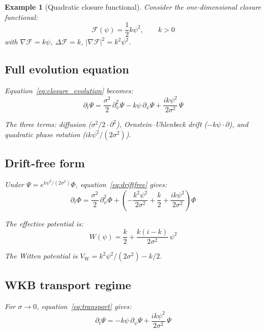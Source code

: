 \documentclass[12pt]{article}
\newtheorem{example}[theorem]{Example}
\newcommand{\Fcal}{\mathcal{F}}
\begin{document}
\begin{example}[Quadratic closure functional]\label{ex:quadratic}
Consider the one-dimensional closure functional:
\begin{equation}
    \Fcal(\psi) = \frac{1}{2}k\psi^2, \qquad k > 0
\end{equation}
with $\nabla\Fcal = k\psi$, $\Delta\Fcal = k$, $|\nabla\Fcal|^2 = k^2\psi^2$.

\subsection*{Full evolution equation}

Equation~\eqref{eq:closure_evolution} becomes:
\begin{equation}\label{eq:quadratic_evo}
    \partial_t \Psi = \frac{\sigma^2}{2}\,\partial_\psi^2 \Psi - k\psi\,\partial_\psi\Psi + \frac{ik\psi^2}{2\sigma^2}\,\Psi
\end{equation}

The three terms: diffusion ($\sigma^2/2\cdot\partial^2$), Ornstein--Uhlenbeck drift ($-k\psi\cdot\partial$), and quadratic phase rotation ($ik\psi^2/(2\sigma^2)$).

\subsection*{Drift-free form}

Under $\Psi = e^{k\psi^2/(2\sigma^2)}\Phi$, equation~\eqref{eq:driftfree} gives:
\begin{equation}
    \partial_t \Phi = \frac{\sigma^2}{2}\,\partial_\psi^2 \Phi + \left(-\frac{k^2\psi^2}{2\sigma^2} + \frac{k}{2} + \frac{ik\psi^2}{2\sigma^2}\right)\Phi
\end{equation}

The effective potential is:
\begin{equation}
    W(\psi) = \frac{k}{2} + \frac{k(i - k)}{2\sigma^2}\,\psi^2
\end{equation}

The Witten potential is $V_{\mathrm{W}} = k^2\psi^2/(2\sigma^2) - k/2$.

\subsection*{WKB transport regime}

For $\sigma \to 0$, equation~\eqref{eq:transport} gives:
\begin{equation}
    \partial_t \Psi = -k\psi\,\partial_\psi\Psi + \frac{ik\psi^2}{2\sigma^2}\,\Psi
\end{equation}


\end{example}
\end{document}
